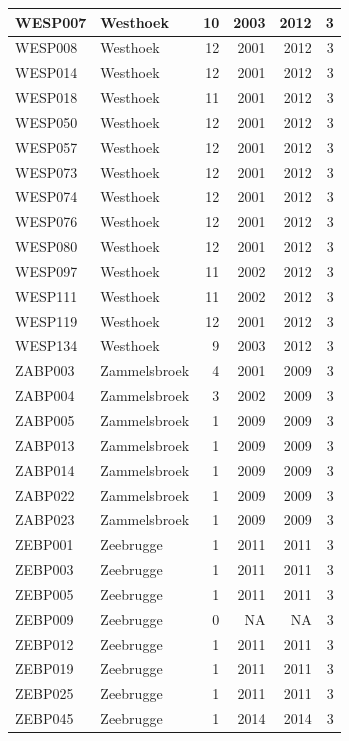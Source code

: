 \documentclass[11pt,]{book}
\begin{document}
\begin{table}
\begin{tabular}[t]{l|l|r|r|r|r}
\hline
WESP007 & Westhoek & 10 & 2003 & 2012 & 3\\
\hline
WESP008 & Westhoek & 12 & 2001 & 2012 & 3\\
\hline
WESP014 & Westhoek & 12 & 2001 & 2012 & 3\\
\hline
WESP018 & Westhoek & 11 & 2001 & 2012 & 3\\
\hline
WESP050 & Westhoek & 12 & 2001 & 2012 & 3\\
\hline
WESP057 & Westhoek & 12 & 2001 & 2012 & 3\\
\hline
WESP073 & Westhoek & 12 & 2001 & 2012 & 3\\
\hline
WESP074 & Westhoek & 12 & 2001 & 2012 & 3\\
\hline
WESP076 & Westhoek & 12 & 2001 & 2012 & 3\\
\hline
WESP080 & Westhoek & 12 & 2001 & 2012 & 3\\
\hline
WESP097 & Westhoek & 11 & 2002 & 2012 & 3\\
\hline
WESP111 & Westhoek & 11 & 2002 & 2012 & 3\\
\hline
WESP119 & Westhoek & 12 & 2001 & 2012 & 3\\
\hline
WESP134 & Westhoek & 9 & 2003 & 2012 & 3\\
\hline
ZABP003 & Zammelsbroek & 4 & 2001 & 2009 & 3\\
\hline
ZABP004 & Zammelsbroek & 3 & 2002 & 2009 & 3\\
\hline
ZABP005 & Zammelsbroek & 1 & 2009 & 2009 & 3\\
\hline
ZABP013 & Zammelsbroek & 1 & 2009 & 2009 & 3\\
\hline
ZABP014 & Zammelsbroek & 1 & 2009 & 2009 & 3\\
\hline
ZABP022 & Zammelsbroek & 1 & 2009 & 2009 & 3\\
\hline
ZABP023 & Zammelsbroek & 1 & 2009 & 2009 & 3\\
\hline
ZEBP001 & Zeebrugge & 1 & 2011 & 2011 & 3\\
\hline
ZEBP003 & Zeebrugge & 1 & 2011 & 2011 & 3\\
\hline
ZEBP005 & Zeebrugge & 1 & 2011 & 2011 & 3\\
\hline
ZEBP009 & Zeebrugge & 0 & NA & NA & 3\\
\hline
ZEBP012 & Zeebrugge & 1 & 2011 & 2011 & 3\\
\hline
ZEBP019 & Zeebrugge & 1 & 2011 & 2011 & 3\\
\hline
ZEBP025 & Zeebrugge & 1 & 2011 & 2011 & 3\\
\hline
ZEBP045 & Zeebrugge & 1 & 2014 & 2014 & 3\\

\end{tabular}
\end{table}
\end{document}
